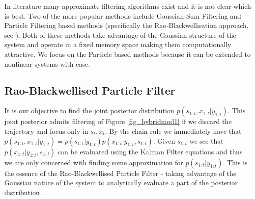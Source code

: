 \documentclass[../masters.tex]{subfiles}
\begin{document}
In literature many approximate filtering algorithms exist and it is not clear which is best. Two of the more popular methods include Gaussian Sum Filtering \cite{barber2} and Particle Filtering based methods (specifically the Rao-Blackwellisation approach, see \cite{chen}\cite{doucet}). Both of these methods take advantage of the Gaussian structure of the system and operate in a fixed memory space making them computationally attractive. We focus on the Particle based methods because it can be extended to nonlinear systems with ease.   

\subsection{Rao-Blackwellised Particle Filter}
It is our objective to find the joint posterior distribution $p(s_{1:t}, x_{1:t}|y_{1:t})$. This joint posterior admits filtering of Figure \ref{fig_hybridmod1} if we discard the trajectory and focus only in $s_t,x_t$. By the chain rule we immediately have that $p(s_{1:t}, x_{1:t}|y_{1:t}) = p(s_{1:t}|y_{1:t})p(x_{1:t}|y_{1:t}, s_{1:t})$. Given $s_{1:t}$ we see that $p(x_{1:t}|y_{1:t}, s_{1:t})$ can be evaluated using the Kalman Filter equations and thus we are only concerned with finding some approximation for $p(s_{1:t}|y_{1:t})$. This is the essence of the Rao-Blackwellised Particle Filter - taking advantage of the Gaussian nature of the system to analytically evaluate a part of the posterior distribution \cite{doucet}.
\end{document}
